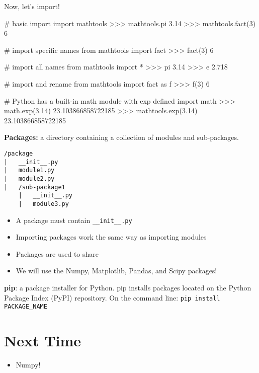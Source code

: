 \documentclass[12pt]{article}
\numberwithin{equation}{section}
\begin{document}
Now, let's import!

\begin{python}
# basic import
import mathtools
>>> mathtools.pi
3.14
>>> mathtools.fact(3)
6

# import specific names
from mathtools import fact
>>> fact(3) 
6

# import all names
from mathtools import *
>>> pi
3.14
>>> e
2.718

# import and rename
from mathtools import fact as f
>>> f(3)
6

# Python has a built-in math module with exp defined
import math
>>> math.exp(3.14)
23.103866858722185
>>> mathtools.exp(3.14)
23.103866858722185
	
\end{python}

\textbf{Packages: }a directory containing a collection of modules and sub-packages.
\begin{verbatim}
/package
|   __init__.py
|   module1.py
|   module2.py
|   /sub-package1
    |   __init__.py
    |   module3.py
\end{verbatim}
\begin{itemize}
    \item A package must contain \verb|__init__.py| 
    \item Importing packages work the same way as importing modules
    \item Packages are used to share 
    \item We will use the Numpy, Matplotlib, Pandas, and Scipy packages!
\end{itemize}

\textbf{pip}: a package installer for Python. pip installs packages located on the Python Package Index (PyPI) repository. On the command line: \verb|pip install PACKAGE_NAME|

\section{Next Time}
\begin{itemize}
    \item Numpy!
\end{itemize}
\end{document}
